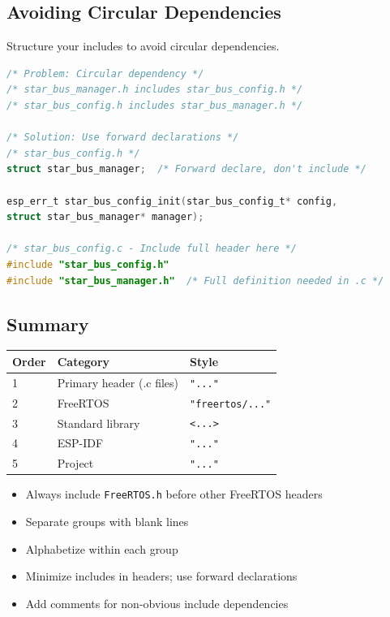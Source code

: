 \subsection{Avoiding Circular Dependencies}

Structure your includes to avoid circular dependencies.

\begin{lstlisting}[language=C]
/* Problem: Circular dependency */
/* star_bus_manager.h includes star_bus_config.h */
/* star_bus_config.h includes star_bus_manager.h */

/* Solution: Use forward declarations */
/* star_bus_config.h */
struct star_bus_manager;  /* Forward declare, don't include */

esp_err_t star_bus_config_init(star_bus_config_t* config,
struct star_bus_manager* manager);

/* star_bus_config.c - Include full header here */
#include "star_bus_config.h"
#include "star_bus_manager.h"  /* Full definition needed in .c */
\end{lstlisting}

\subsection{Summary}

\begin{center}
\begin{tabular}{|l|l|l|}
\hline
\textbf{Order} & \textbf{Category} & \textbf{Style} \\
\hline
1 & Primary header (.c files) & \texttt{"..."} \\
\hline
2 & FreeRTOS & \texttt{"freertos/..."} \\
\hline
3 & Standard library & \texttt{<...>} \\
\hline
4 & ESP-IDF & \texttt{"..."} \\
\hline
5 & Project & \texttt{"..."} \\
\hline
\end{tabular}
\end{center}

\begin{itemize}
    \item Always include \texttt{FreeRTOS.h} before other FreeRTOS headers
    \item Separate groups with blank lines
    \item Alphabetize within each group
    \item Minimize includes in headers; use forward declarations
    \item Add comments for non-obvious include dependencies
\end{itemize}


